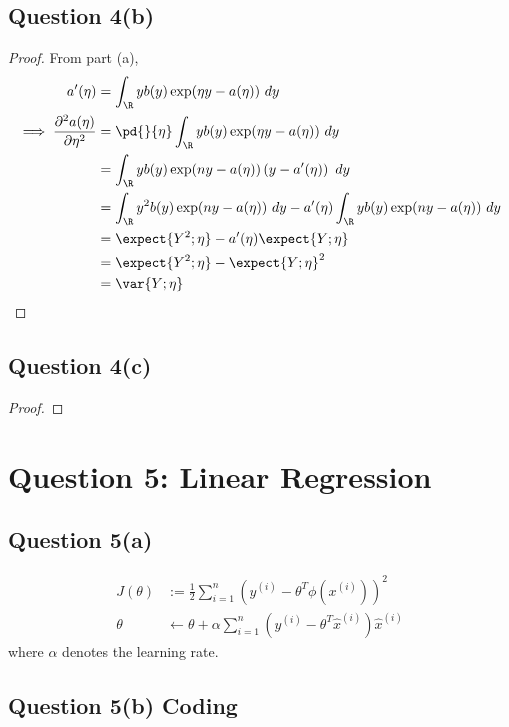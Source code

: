 \documentclass[11pt]{article}
\newcommand{\upi}[0]{^{(i)}}
\begin{document}
	\newpage
	\subsection{Question 4(b)}
	\begin{proof}
		From part (a),
		\begin{align}
			a'(\eta) &= \int_\R y b(y) \exp(\eta y - a(\eta))\ dy \\
			\implies \frac{\partial^2 a(\eta)}{\partial \eta^2} &= \pd{}{\eta} \int_\R y b(y) \exp(\eta y - a(\eta))\ dy \\
			&= \int_\R y b(y) \exp(ny - a(\eta)) \left (
				y - a'(\eta)
			\right)\ dy \\
			&= \int_\R y^2 b(y) \exp(ny - a(\eta))\ dy - a'(\eta) \int_\R y b(y) \exp(ny - a(\eta))\ dy \\
			&= \expect{Y^2; \eta} - a'(\eta) \expect{Y; \eta} \\
			&= \expect{Y^2; \eta} - \expect{Y; \eta}^2 \\
			&= \var{Y; \eta}
		\end{align}
	\end{proof}
	
	\newpage
	\subsection{Question 4(c)}
	\begin{proof}
		
	\end{proof}
	
	\newpage
	\section{Question 5: Linear Regression}
	\subsection{Question 5(a)}
	\begin{align}
		J(\theta) &:= \frac{1}{2} \sum_{i=1}^n \left(y\upi - \theta^T \phi(x\upi) \right)^2 \\
		\theta &\leftarrow \theta + \alpha \sum_{i=1}^n \left(y\upi - \theta^T \hat{x}\upi \right) \hat{x}\upi
	\end{align}
	where $\alpha$ denotes the learning rate.
	\subsection{Question 5(b) Coding}
\end{document}
